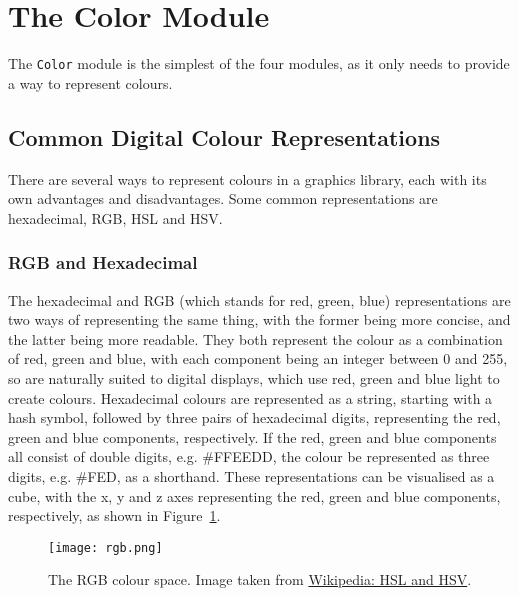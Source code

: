 \documentclass[../main.tex]{subfiles}
\begin{document}
    \section{The Color Module}
        The \verb|Color| module is the simplest of the four modules, as it only needs
            to provide a way to represent colours.

        \subsection{Common Digital Colour Representations}
            There are several ways to represent colours in a graphics library, each with
                its own advantages and disadvantages.
            Some common representations are hexadecimal, RGB, HSL and HSV.

            \subsubsection{RGB and Hexadecimal}
                The hexadecimal and RGB (which stands for red, green, blue) representations are
                    two ways of representing the same thing, with the former being more concise,
                    and the latter being more readable.
                They both represent the colour as a combination of red, green and blue, with
                    each component being an integer between 0 and 255, so are naturally suited to
                    digital displays, which use red, green and blue light to create colours.
                Hexadecimal colours are represented as a string, starting with a hash symbol,
                    followed by three pairs of hexadecimal digits, representing the red, green and
                    blue components, respectively.
                If the red, green and blue components all consist of double digits, e.g.
                    \#FFEEDD, the colour be represented as three digits, e.g. \#FED, as a
                    shorthand.
                These representations can be visualised as a cube, with the x, y and z axes
                    representing the red, green and blue components, respectively, as shown in
                    Figure~\ref{fig:rgb}.

                \begin{figure}[H]
                    \centering
                    \texttt{[image: rgb.png]}
                        \caption{The RGB colour space.
                            Image taken from \href{https://en.wikipedia.org/wiki/HSL_and_HSV}{Wikipedia:
                                    HSL and HSV}.
                        }
                        \label{fig:rgb}
                \end{figure}
\end{document}
